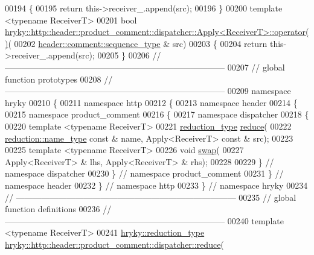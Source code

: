 \begin{DoxyCode}
00194 \{
00195     \textcolor{keywordflow}{return} this->receiver\_.append(src);
00196 \}
00200 \textcolor{keyword}{template} <\textcolor{keyword}{typename} ReceiverT>
00201 \textcolor{keywordtype}{bool} 
      \hyperlink{classhryky_1_1http_1_1header_1_1product__comment_1_1dispatcher_1_1_apply}{hryky::http::header::product_comment::dispatcher::Apply<ReceiverT>::operator()}(
00202     \hyperlink{classhryky_1_1http_1_1header_1_1comment_1_1_sequence}{header::comment::sequence_type} & src)
00203 \{
00204     \textcolor{keywordflow}{return} this->receiver\_.append(src);
00205 \}
00206 \textcolor{comment}{//
      ------------------------------------------------------------------------------}
00207 \textcolor{comment}{// global function prototypes}
00208 \textcolor{comment}{//
      ------------------------------------------------------------------------------}
00209 \textcolor{keyword}{namespace }hryky
00210 \{
00211 \textcolor{keyword}{namespace }http
00212 \{
00213 \textcolor{keyword}{namespace }header
00214 \{
00215 \textcolor{keyword}{namespace }product\_comment
00216 \{
00217 \textcolor{keyword}{namespace }dispatcher
00218 \{
00220     \textcolor{keyword}{template} <\textcolor{keyword}{typename} ReceiverT>
00221     \hyperlink{classhryky_1_1_intrusive_ptr}{reduction_type} \hyperlink{namespacehryky_1_1http_a08fc36a78a8e2908140fcd102829a566}{reduce}(
00222         \hyperlink{classhryky_1_1reduction_1_1_string}{reduction::name_type} \textcolor{keyword}{const} & name, Apply<ReceiverT> \textcolor{keyword}{const} & src);
00223 
00225     \textcolor{keyword}{template} <\textcolor{keyword}{typename} ReceiverT>
00226     \textcolor{keywordtype}{void} \hyperlink{namespacehryky_1_1http_a38e62595ad532d18fbc65ceb61973aec}{swap}(
00227         Apply<ReceiverT> & lhs, Apply<ReceiverT> & rhs);
00228 
00229 \} \textcolor{comment}{// namespace dispatcher}
00230 \} \textcolor{comment}{// namespace product\_comment}
00231 \} \textcolor{comment}{// namespace header}
00232 \} \textcolor{comment}{// namespace http}
00233 \} \textcolor{comment}{// namespace hryky}
00234 \textcolor{comment}{//
      ------------------------------------------------------------------------------}
00235 \textcolor{comment}{// global function definitions}
00236 \textcolor{comment}{//
      ------------------------------------------------------------------------------}
00240 \textcolor{comment}{}\textcolor{keyword}{template} <\textcolor{keyword}{typename} ReceiverT>
00241 \hyperlink{classhryky_1_1_intrusive_ptr}{hryky::reduction_type} \hyperlink{namespacehryky_1_1http_a08fc36a78a8e2908140fcd102829a566}{hryky::http::header::product_comment::dispatcher::reduce}(

\end{DoxyCode}
